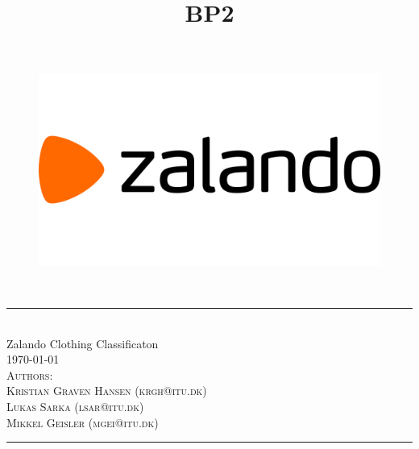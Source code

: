 \title{BP2}
\begin{titlepage}
\centering
\newcommand{\HLine}{\rule{\linewidth}{0.5mm}}

\begin{figure}[h]
\centering
\includegraphics[width=12cm]{figures_for_report/Zalando-Logo}
\end{figure}
\hfill \break
\hfill \break
\textsc{\Large}\\
\HLine \\[0.5cm]
\huge Zalando Clothing Classificaton \\
\small{\today}\\
\vspace*{.5cm}
\textsc{\large Authors:
\\Kristian Graven Hansen (krgh@itu.dk)
\\Lukas Sarka (lsar@itu.dk)
\\Mikkel Geisler (mgei@itu.dk)}\\[0.5cm]
\HLine

\begin{minipage}{0.45\textwidth}
\begin{flushleft} \large
\end{flushleft}
\end{minipage}
\begin{minipage}{0.5\textwidth}
\begin{flushright} \large
\end{flushright}
\end{minipage}
\vfill
\end{titlepage}
\pagebreak